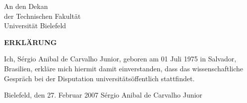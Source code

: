\documentclass[11pt,a4paper]{article}
\begin{document}
\pagestyle{empty}
\noindent
An den Dekan\\
der Technischen Fakult\"at\\
Universit\"at Bielefeld

\vspace{2cm}

\begin{center}
  {\bf \Large ERKL\"ARUNG}
\end{center}

\vspace{2cm}

\noindent Ich, S\'ergio Anibal de Carvalho Junior, geboren am 01 Juli 1975 in
Salvador, Brasilien, erkl\"are mich hiermit damit einverstanden, dass das
wissenschaftliche Gespr\"ach bei der Disputation universit\"ats\"offentlich
stattfindet.

\vspace{4cm}

\noindent Bielefeld, den 27. Februar 2007 \hfill S\'ergio Anibal de Carvalho Junior
\end{document}

